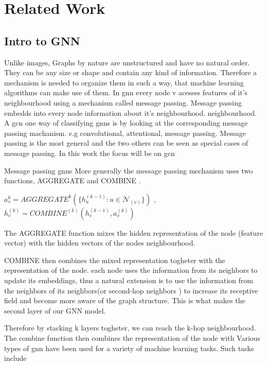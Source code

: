 %
\chapter{Related Work}
\label{sec:related}


\section{Intro to GNN}
\label{sec:related:sec1}
Unlike images, Graphs by nature are unstructured and have no natural order.
They can be any size or shape and contain any kind of information.
Therefore a mechanism is needed to organize them in such a way, that machine learning algorithms
can make use of them.
In \ac{gnn} every node v acesses features of it's neighbourhood using a mechanism called message passing.
Message passing embedds into every node information about it's neighbourhood.
neighbourhood. A \ac{gcn} one way of classifying \acp{gnn} is by looking at the corresponding message passing
machanism. e.g convolutional, attentional, message passing.
Message passing is the most general and the two others can be seen as special cases of message passing.
In this work the focus will be on \ac{gcn}



Message passing \acp{gnn}
More generally the message passing mechanism  uses two functions,
AGGREGATE and COMBINE \cite{Xu2019}.

$a_{v}^{k} = AGGREGATE^{k}(\{h_{u}^{(k-1)}: u \in \mathcal{N}_{(v)}\})$ , $h_{v}^{(k)} = COMBINE^{(k)}(h_{v}^{(k-1)}, a_{v}^{(k)})$

The AGGREGATE function mixes the hidden representation of the node (feature vector)
with the hidden vectors of the nodes neighbourhood.

COMBINE then combines the mixed representation togheter with the representation of the node.
each node uses the information from its neighbors to update its embeddings, thus a natural extension is to use the information
from the neighbors of its neighbors(or second-hop neighbors )
to increase its receptive field and become more aware of the
graph structure. This is what makes the second layer of our GNN
model.

Therefore by stacking k layers togheter, we can reach the k-hop neighbourhood.
The combine function then combines the representation of the node with
Various types of \ac{gnn} have been used for a variety of machine learning tasks.
Such tasks include

